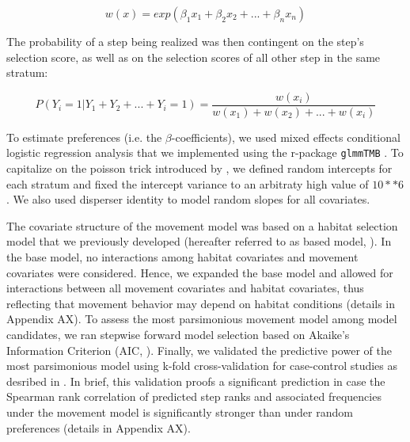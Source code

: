 \documentclass[abstract=on,10pt,a4paper,bibliography=totocnumbered]{article}
\begin{document}
\begin{equation}
\label{EQ1}
  w(x) = exp(\beta_1 x_1 + \beta_2 x_2 + ... + \beta_n x_n)
\end{equation}

The probability of a step being realized was then contingent on the step's
selection score, as well as on the selection scores of all other step in the
same stratum:

\begin{equation}
\label{EQ2}
  P(Y_{i} = 1 | Y_{1} + Y_{2} + ... + Y_{i} = 1) =
  \frac{w(x_{i})}{w(x_{1}) + w(x_{2}) + ... + w(x_{i})}
\end{equation}

\noindent To estimate preferences (i.e. the \(\beta\)-coefficients), we used
mixed effects conditional logistic regression analysis \citep{Muff.2020} that we
implemented using the r-package {\tt glmmTMB} \citep{Brooks.2017}. To capitalize
on the poisson trick introduced by \cite{Muff.2020}, we defined random
intercepts for each stratum and fixed the intercept variance to an arbitraty
high value of \(10 ** 6\). We also used disperser identity to model random
slopes for all covariates.

The covariate structure of the movement model was based on a habitat selection
model that we previously developed (hereafter referred to as based model,
\citealp{Hofmann.2021}). In the base model, no interactions among habitat
covariates and movement covariates were considered. Hence, we expanded the base
model and allowed for interactions between all movement covariates and habitat
covariates, thus reflecting that movement behavior may depend on habitat
conditions (details in Appendix AX). To assess the most parsimonious movement
model among model candidates, we ran stepwise forward model selection based on
Akaike's Information Criterion (AIC, \citealp{Burnham.2002}). Finally, we
validated the predictive power of the most parsimonious model using k-fold
cross-validation for case-control studies as desribed in \cite{Fortin.2009}. In
brief, this validation proofs a significant prediction in case the Spearman rank
correlation of predicted step ranks and associated frequencies under the
movement model is significantly stronger than under random preferences (details
in Appendix AX).
\end{document}
